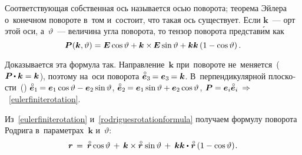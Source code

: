 \begin{otherlanguage}{russian}
\vspace{-0.5em} \noindent Соответствующая собственная ось называется осью поворота; теорема Эйлера о~конечном повороте в~том и~состоит, что такая ось существует. Если ${\bm{k}}$~--- орт этой оси, а~${\vartheta}$~--- величина угла поворота, то тензор поворота представ\'{и}м как
\vspace{0.2em}\begin{equation}\label{eulerfiniterotation}
\bm{P}\hspace{0.1ex}(\bm{k},\vartheta) = \bm{E} \operatorname{cos} \vartheta + \bm{k} \times\hspace{-0.2ex} \bm{E} \operatorname{sin} \vartheta + \bm{k} \bm{k} \left({1 - \operatorname{cos} \vartheta}\right).
\end{equation}\vspace{-1.2em}

Доказывается эта формула так. Направление~${\bm{k}}$ при~повороте не~меняется~(${\bm{P} \hspace{-0.16ex}\dotp \bm{k} = \bm{k}\hspace{0.12ex}}$), поэтому на~оси поворота ${\mathcircabove{\bm{e}}_3 \hspace{-0.16ex} = \bm{e}_3 \hspace{-0.16ex} = \bm{k}}$. В~перпендикулярной плоскости~() ${\mathcircabove{\bm{e}}_1 \hspace{-0.16ex} = \bm{e}_1 \operatorname{cos} \vartheta - \bm{e}_2 \operatorname{sin} \vartheta}$, ${\mathcircabove{\bm{e}}_2 \hspace{-0.16ex} = \bm{e}_1 \operatorname{sin} \vartheta + \bm{e}_2 \operatorname{cos} \vartheta}$, ${\bm{P} = \bm{e}_i \mathcircabove{\bm{e}}_i \:\Rightarrow}$~\eqref{eulerfiniterotation}.



Из~\eqref{eulerfiniterotation} и~\eqref{rodriguesrotationformula} получаем формулу поворота Родрига в~параметрах~$\bm{k}$ и~$\vartheta$:
\nopagebreak\vspace{-0.2em}\begin{equation*}
\bm{r} \hspace{0.4ex}=\hspace{0.5ex} \mathcircabove{\bm{r}} \operatorname{cos} \vartheta \hspace{0.4ex}+\hspace{0.4ex} \bm{k} \times \mathcircabove{\bm{r}} \hspace{0.2ex} \operatorname{sin} \vartheta \hspace{0.4ex}+\hspace{0.5ex} \bm{k} \bm{k} \dotp\hspace{0.1ex} \mathcircabove{\bm{r}} \left({1 - \operatorname{cos} \vartheta}\right) \hspace{-0.25ex}.
\end{equation*}


\end{otherlanguage}
